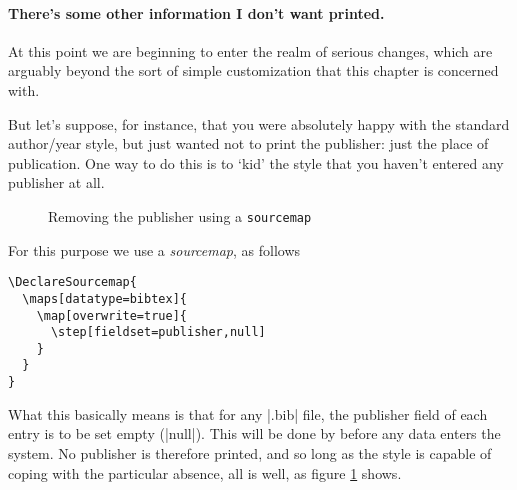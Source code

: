 \paragraph{There's some other information I don't want printed.} At
this point we are beginning to enter the realm of serious changes,
which are arguably beyond the sort of simple customization that this
chapter is concerned with.

But let's suppose, for instance, that you were absolutely happy with
the standard author/year style, but just wanted not to print the
publisher: just the place of publication. One way to do this is to
`kid' the style that you haven't entered any publisher at all.
\begin{figure}
\vspace{0.5\baselineskip}

\caption{Removing the publisher using a \texttt{sourcemap}\label{punctcite12}}
\end{figure}

For this purpose we use a \emph{sourcemap}, as follows
\begin{Verbatim}
\DeclareSourcemap{
  \maps[datatype=bibtex]{
    \map[overwrite=true]{
      \step[fieldset=publisher,null]
    }
  }
}
\end{Verbatim}
What this basically means is that for any |.bib| file, the publisher
field of each entry is to be set empty (|null|). This will be done by
 before any data enters the system. No publisher is
therefore printed, and so long as the style is capable of coping with
the particular absence, all is well, as figure \ref{punctcite12}
shows.

